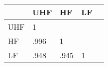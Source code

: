 \documentclass{article}
\begin{document}
\begin{table}
    \begin{tabular}{l|llll}
        & UHF  & HF   & LF &  \\
        \hline
        UHF & 1    &      &    &  \\
        HF  & .996 & 1    &    &  \\
        LF  & .948 & .945 & 1  &
    \end{tabular}
\end{table}
\end{document}
